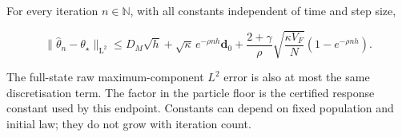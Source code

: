 \documentclass[11pt,a4paper]{report}
\begin{document}
For every iteration \(n\in\mathbb N\), with all constants independent of time and step size,





\[\|\hat\theta_n-\theta_\star\|_{\mathrm L^2}\le D_M\sqrt h+\sqrt\kappa\,e^{-\rho nh}\mathbf d_0+\frac{2+\gamma}{\rho}\sqrt{\frac{\kappa V_F}{N}}(1-e^{-\rho nh}).\]







The full-state raw maximum-component \(L^2\) error is also at most the same discretisation term. The factor in the particle floor is the certified response constant used by this endpoint. Constants can depend on fixed population and initial law; they do not grow with iteration count.
\end{document}
